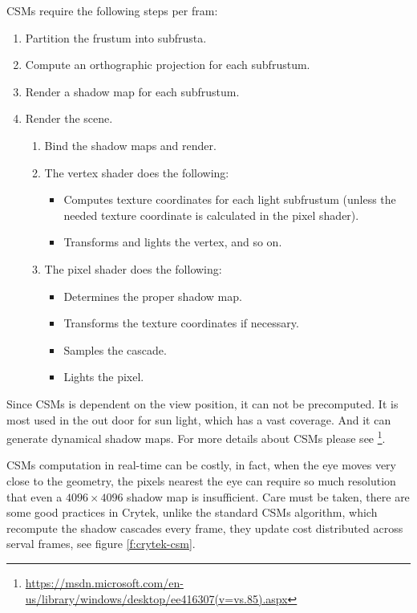 CSMs require the following steps per fram:

\begin{enumerate}
	\item Partition the frustum into subfrusta.
	\item Compute an orthographic projection for each subfrustum.
	\item Render a shadow map for each subfrustum.
	\item Render the scene.
	\begin{enumerate}
		\item Bind the shadow maps and render.
		\item The vertex shader does the following:
		\begin{itemize}
			\item Computes texture coordinates for each light subfrustum (unless the needed texture coordinate is calculated in the pixel shader).
			\item Transforms and lights the vertex, and so on.
		\end{itemize}
		\item The pixel shader does the following:
		\begin{itemize}
			\item 	Determines the proper shadow map.
			\item Transforms the texture coordinates if necessary.
			\item Samples the cascade.
			\item Lights the pixel.
		\end{itemize}
	\end{enumerate}
\end{enumerate}

Since CSMs is dependent on the view position, it can not be precomputed. It is most used in the out door for sun light, which has a vast coverage. And it can generate dynamical shadow maps. For more details about CSMs please see \footnote{\url{https://msdn.microsoft.com/en-us/library/windows/desktop/ee416307(v=vs.85).aspx}}.

CSMs computation in real-time can be costly, in fact, when the eye moves very close to the geometry, the pixels nearest the eye can require so much resolution that even a $4096\times 4096$ shadow map is insufficient. Care must be taken, there are some good practices in Crytek\cite{a:PlayingwithReal-TimeShadows}, unlike the standard CSMs algorithm, which recompute the shadow cascades every frame, they update cost distributed across serval frames, see figure \ref{f:crytek-csm}.

